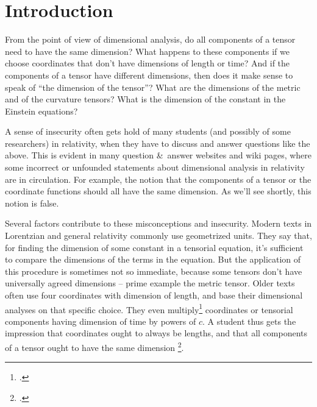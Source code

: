 \documentclass[\ifafour a4paper,12pt,\else a5paper,10pt,\fi%
onecolumn,oneside,article,%
british%
]{memoir}
\theoremstyle{remark}
\theoremstyle{innote}
\newcommand*{\citep}{\footcites}
\newcommand*{\amp}{\&}
\renewcommand*{\|}[1][]{\nonscript\,#1\vert\nonscript\;\mathopen{}}
\newcommand*{\sect}{\S}%
\newcommand*{\eqn}{eq.}%
\newcommand*{\eg}{{e.g.}}
\begin{document}

\section{Introduction}
\label{sec:intro}


From the point of view of dimensional analysis, do all components of a
tensor need to have the same dimension? What happens to these components if
we choose coordinates that don't have dimensions of length or time? And if
the components of a tensor have different dimensions, then does it make
sense to speak of \enquote{the dimension of the tensor}? What are the
dimensions of the metric and of the curvature tensors? What is the
dimension of the constant in the Einstein equations?

A sense of insecurity often gets hold of many students (and possibly of
some researchers) in relativity, when they have to discuss and answer
questions like the above. %
This is evident in many question \amp\ answer websites and wiki pages,
where some incorrect or unfounded statements about dimensional analysis in
relativity are in circulation. For example, the notion that the components
of a tensor or the coordinate functions should all have the same dimension.
As we'll see shortly, this notion is false.

Several factors contribute to these misconceptions and insecurity. Modern
texts in Lorentzian and general relativity commonly use geometrized units.
They say that, for finding the dimension of some constant in a tensorial
equation, it's sufficient to compare the dimensions of the terms in the
equation. But the application of this procedure is sometimes not so
immediate, because some tensors don't have universally agreed dimensions --
prime example the metric tensor. Older texts often use four coordinates
with dimension of length, and base their dimensional analyses on that
specific choice. They even multiply\citep[\eg][p.~71
\eqn~(37.1)]{tolman1934_t1949}[p.~80
\eqn~(32.15)]{landauetal1939_t1996}[p.~332
\eqn~(10.15)]{adleretal1965_r1975} coordinates or tensorial components
having dimension of time by powers of $c$. A student thus gets the
impression that coordinates ought to always be lengths, and that all
components of a tensor ought to have the same dimension \citep[A recent
work explicitly stating, if only in passing, that this needs not be the
case is][\sect~X]{kitano2013}.
\end{document}
